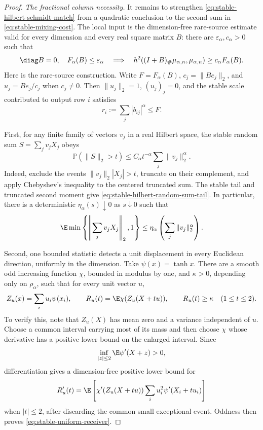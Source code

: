 \begin{proof}
\emph{The fractional column necessity.}
It remains to strengthen \eqref{eq:stable-hilbert-schmidt-match} from a
quadratic conclusion to the second sum in
\eqref{eq:stable-mixing-cost}.
The local input is the dimension-free rare-source estimate
valid for every dimension and every real square matrix \(B\): there are
\(\varepsilon_\alpha,c_\alpha>0\) such that
\begin{equation}
 \diag B=0,\quad F_\alpha(B)\le\varepsilon_\alpha
 \quad\Longrightarrow\quad
 h^2((I+B)_\#\mu_{\alpha,n},\mu_{\alpha,n})
 \ge c_\alpha F_\alpha(B).
 \label{eq:stable-rare-source-bound}
\end{equation}
Here is the rare-source construction.
Write \(F=F_\alpha(B)\),
\(c_j=\|Be_j\|_2\), and
\(u_j=Be_j/c_j\) when \(c_j\ne0\).
Then \(\|u_j\|_2=1\), \((u_j)_j=0\), and the stable scale contributed to
output row \(i\) satisfies
\begin{equation}
 r_i:=\sum_j|b_{ij}|^\alpha\le F.
 \label{eq:stable-row-scale-bound}
\end{equation}

First, for any finite family of vectors \(v_j\) in a real Hilbert space,
the stable random sum \(S=\sum_jv_jX_j\) obeys
\begin{equation}
 \mathbb P(\|S\|_2>t)
 \le C_\alpha t^{-\alpha}\sum_j\|v_j\|_2^\alpha.
 \label{eq:stable-hilbert-random-sum-tail}
\end{equation}
Indeed, exclude the events
\(\|v_j\|_2|X_j|>t\), truncate on their complement, and apply Chebyshev's
inequality to the centered truncated sum.
The stable tail and truncated second moment give
\eqref{eq:stable-hilbert-random-sum-tail}.
In particular, there is a deterministic
\(\eta_\alpha(s)\downarrow0\) as \(s\downarrow0\) such that
\begin{equation}
 \E\min\left\{\left\|\sum_jv_jX_j\right\|_2,1\right\}
 \le\eta_\alpha\left(\sum_j\|v_j\|_2^\alpha\right).
 \label{eq:stable-hilbert-random-sum-truncation}
\end{equation}

Second, one bounded statistic detects a unit displacement in every
Euclidean direction, uniformly in the dimension.
Take \(\psi(x)=\tanh x\).
There are a smooth odd increasing function \(\chi\), bounded in modulus by
one, and
\(\kappa>0\), depending only on \(\rho_\alpha\), such that for every unit
vector \(u\),
\begin{equation}
 Z_u(x)=\sum_i u_i\psi(x_i),
 \qquad
 R_u(t)=\E\chi(Z_u(X+tu)),
 \qquad
 R_u(t)\ge\kappa\quad(1\le t\le2).
 \label{eq:stable-uniform-receiver}
\end{equation}
To verify this, note that \(Z_u(X)\) has mean zero and a variance independent
of \(u\).
Choose a common interval carrying most of its mass and then choose \(\chi\)
whose derivative has a positive lower bound on the enlarged interval.
Since
\[
 \inf_{|z|\le2}\E\psi'(X+z)>0,
\]
differentiation gives a dimension-free positive lower bound for
\[
 R_u'(t)=\E\left[
   \chi'(Z_u(X+tu))\sum_i u_i^2\psi'(X_i+tu_i)
                 \right]
\]
when \(|t|\le2\), after discarding the common small exceptional event.
Oddness then proves \eqref{eq:stable-uniform-receiver}.


\end{proof}
